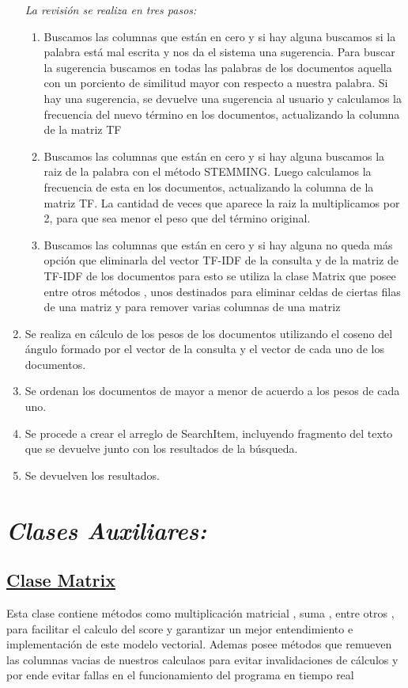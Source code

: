 \documentclass{article}%
\begin{document}
\begin{enumerate}
    \small{\emph{La revisión se realiza en tres pasos:}}
    \begin{enumerate}     
        \item Buscamos las columnas que están en cero y si hay alguna buscamos si la palabra está mal escrita y nos da el sistema una sugerencia. Para buscar la sugerencia buscamos en todas las palabras de los documentos aquella con un porciento de similitud mayor con respecto a nuestra palabra. Si hay una sugerencia, se devuelve una sugerencia al usuario y calculamos la frecuencia del nuevo término en los documentos, actualizando la columna de la matriz TF
    \item Buscamos las columnas que están en cero y si hay alguna buscamos la raiz de la palabra con el método STEMMING. Luego calculamos la frecuencia de esta en los documentos, actualizando la columna de la matriz TF. La cantidad de veces que aparece la raiz la multiplicamos por 2, para que sea menor el peso que del término original.
    \item Buscamos las columnas que están en cero y si hay alguna no queda más opción que eliminarla del vector TF-IDF de la consulta y de la matriz de TF-IDF de los documentos para esto se utiliza la clase Matrix que posee entre otros métodos , unos destinados para eliminar celdas de ciertas filas de una matriz y para remover varias columnas de una matriz
\end{enumerate}
\item Se realiza en cálculo de los pesos de los documentos utilizando el coseno del ángulo formado por el vector de la consulta y el vector de cada uno de los documentos.
\item Se ordenan los documentos de mayor a menor de acuerdo a los pesos de cada uno.
\item Se procede a crear el arreglo de SearchItem, incluyendo fragmento del texto que se devuelve junto con los resultados de la búsqueda.
\item Se devuelven los resultados.
    \end{enumerate}

    \section{\emph{Clases Auxiliares:}}
    \subsection{\underline{Clase Matrix}}
    Esta clase contiene métodos como multiplicación matricial , suma , entre otros , para facilitar el calculo del score y garantizar un mejor entendimiento e implementación de este modelo vectorial. Ademas posee métodos que remueven las columnas vacias de nuestros calculaos para evitar invalidaciones de cálculos y por ende evitar fallas en el funcionamiento del programa en tiempo real
\end{document}
